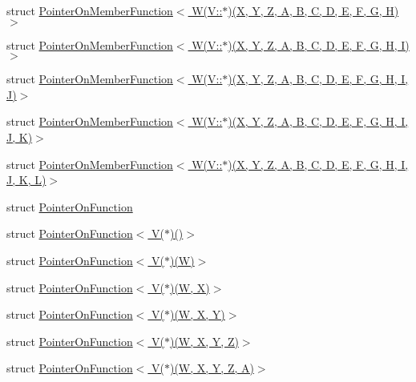 \begin{DoxyCompactItemize}
\item 
struct \hyperlink{structutilspp_1_1PointerOnMemberFunction_3_01W_07V_1_1_5_08_07X_00_01Y_00_01Z_00_01A_00_01B_00_0c1190c13a8ba22e2b017a7c30228b2d5}{Pointer\-On\-Member\-Function$<$ W(\-V\-::$\ast$)(\-X, Y, Z, A, B, C, D, E, F, G, H)$>$}
\item 
struct \hyperlink{structutilspp_1_1PointerOnMemberFunction_3_01W_07V_1_1_5_08_07X_00_01Y_00_01Z_00_01A_00_01B_00_0bbd85fb2705c5ddb5a380fdcfc065534}{Pointer\-On\-Member\-Function$<$ W(\-V\-::$\ast$)(\-X, Y, Z, A, B, C, D, E, F, G, H, I)$>$}
\item 
struct \hyperlink{structutilspp_1_1PointerOnMemberFunction_3_01W_07V_1_1_5_08_07X_00_01Y_00_01Z_00_01A_00_01B_00_0f132510bb9cf4ca10da452dc78c1be57}{Pointer\-On\-Member\-Function$<$ W(\-V\-::$\ast$)(\-X, Y, Z, A, B, C, D, E, F, G, H, I, J)$>$}
\item 
struct \hyperlink{structutilspp_1_1PointerOnMemberFunction_3_01W_07V_1_1_5_08_07X_00_01Y_00_01Z_00_01A_00_01B_00_0b928f54f704c64390834c6654b40f718}{Pointer\-On\-Member\-Function$<$ W(\-V\-::$\ast$)(\-X, Y, Z, A, B, C, D, E, F, G, H, I, J, K)$>$}
\item 
struct \hyperlink{structutilspp_1_1PointerOnMemberFunction_3_01W_07V_1_1_5_08_07X_00_01Y_00_01Z_00_01A_00_01B_00_07161b1228eaaa251377e300b0722bf86}{Pointer\-On\-Member\-Function$<$ W(\-V\-::$\ast$)(\-X, Y, Z, A, B, C, D, E, F, G, H, I, J, K, L)$>$}
\item 
struct \hyperlink{structutilspp_1_1PointerOnFunction}{Pointer\-On\-Function}
\item 
struct \hyperlink{structutilspp_1_1PointerOnFunction_3_01V_07_5_08_07_08_4}{Pointer\-On\-Function$<$ V($\ast$)()$>$}
\item 
struct \hyperlink{structutilspp_1_1PointerOnFunction_3_01V_07_5_08_07W_08_4}{Pointer\-On\-Function$<$ V($\ast$)(\-W)$>$}
\item 
struct \hyperlink{structutilspp_1_1PointerOnFunction_3_01V_07_5_08_07W_00_01X_08_4}{Pointer\-On\-Function$<$ V($\ast$)(\-W, X)$>$}
\item 
struct \hyperlink{structutilspp_1_1PointerOnFunction_3_01V_07_5_08_07W_00_01X_00_01Y_08_4}{Pointer\-On\-Function$<$ V($\ast$)(\-W, X, Y)$>$}
\item 
struct \hyperlink{structutilspp_1_1PointerOnFunction_3_01V_07_5_08_07W_00_01X_00_01Y_00_01Z_08_4}{Pointer\-On\-Function$<$ V($\ast$)(\-W, X, Y, Z)$>$}
\item 
struct \hyperlink{structutilspp_1_1PointerOnFunction_3_01V_07_5_08_07W_00_01X_00_01Y_00_01Z_00_01A_08_4}{Pointer\-On\-Function$<$ V($\ast$)(\-W, X, Y, Z, A)$>$}

\end{DoxyCompactItemize}
